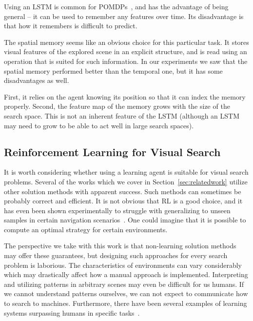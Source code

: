 Using an LSTM is common for POMDPs~\cite{hausknecht_deep_2017,mnih_asynchronous_2016,mirowski_learning_2017}, and has the advantage of being general --
it can be used to remember any features over time.
Its disadvantage is that how it remembers is difficult to predict.

The spatial memory seems like an obvious choice for this particular task.
It stores visual features of the explored scene in an explicit structure, and is read using an operation that is suited for such information.
In our experiments we saw that the spatial memory performed better than the temporal one,
but it has some disadvantages as well.

First, it relies on the agent knowing its position so that it can index the memory properly.
Second, the feature map of the memory grows with the size of the search space.
This is not an inherent feature of the LSTM (although an LSTM may need to grow to be able to act well in large search spaces).


\subsection{Reinforcement Learning for Visual Search}

It is worth considering whether using a learning agent is suitable for visual search problems.
Several of the works which we cover in Section~\ref{sec:relatedwork} utilize other solution methods with apparent success.
Such methods can sometimes be probably correct and efficient.
It is not obvious that RL is a good choice, and it has even been shown experimentally to struggle with generalizing to unseen samples in certain navigation scenarios~\cite{dhiman_critical_2019}.
One could imagine that it is possible to compute an optimal strategy for certain environments.

The perspective we take with this work is that non-learning solution methods may offer these guarantees, but designing such approaches for every search problem is laborious.
The characteristics of environments can vary considerably which may drastically affect how a manual approach is implemented.
Interpreting and utilizing patterns in arbitrary scenes may even be difficult for us humans.
If we cannot understand patterns ourselves, we can not expect to communicate how to search to machines.
Furthermore, there have been several examples of learning systems surpassing humans in specific tasks~\cite{silver_mastering_2016,vinyals_grandmaster_2019}.

